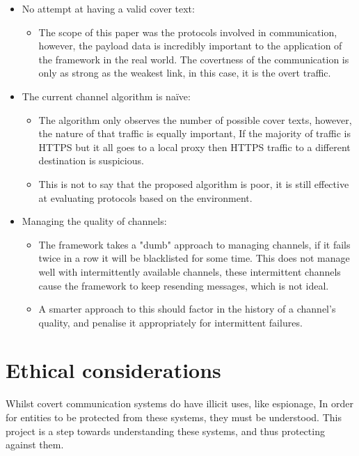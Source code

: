 \begin{itemize}
    \item No attempt at having a valid cover text:
    \begin{itemize}
        \item The scope of this paper was the protocols involved in communication, however, the payload data is incredibly important to the application of the framework in the real world. The covertness of the communication is only as strong as the weakest link, in this case, it is the overt traffic.
    \end{itemize}
    \item The current channel algorithm is na\"ive:
    \begin{itemize}
        \item The algorithm only observes the number of possible cover texts, however, the nature of that traffic is equally important, If the majority of traffic is HTTPS but it all goes to a local proxy then HTTPS traffic to a different destination is suspicious.
        \item This is not to say that the proposed algorithm is poor, it is still effective at evaluating protocols based on the environment.
    \end{itemize}
    \item Managing the quality of channels:
    \begin{itemize}
        \item The framework takes a "dumb" approach to managing channels, if it fails twice in a row it will be blacklisted for some time. This does not manage well with intermittently available channels, these intermittent channels cause the framework to keep resending messages, which is not ideal.
        \item A smarter approach to this should factor in the history of a channel's quality, and penalise it appropriately for intermittent failures.
    \end{itemize}
\end{itemize}

\section{Ethical considerations}

Whilst covert communication systems do have illicit uses, like espionage, In order for entities to be protected from these systems, they must be understood. This project is a step towards understanding these systems, and thus protecting against them.